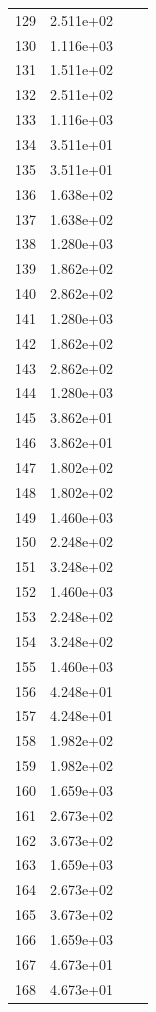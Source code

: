 \documentclass[12pt]{article}
\begin{document}
\begin{longtable}{@{}cccc@{}}
129 & 2.511e+02 &  &  \\
130 & 1.116e+03 &  &  \\
131 & 1.511e+02 &  &  \\
132 & 2.511e+02 &  &  \\
133 & 1.116e+03 &  &  \\
134 & 3.511e+01 &  &  \\
135 & 3.511e+01 &  &  \\
136 & 1.638e+02 &  &  \\
137 & 1.638e+02 &  &  \\
138 & 1.280e+03 &  &  \\
139 & 1.862e+02 &  &  \\
140 & 2.862e+02 &  &  \\
141 & 1.280e+03 &  &  \\
142 & 1.862e+02 &  &  \\
143 & 2.862e+02 &  &  \\
144 & 1.280e+03 &  &  \\
145 & 3.862e+01 &  &  \\
146 & 3.862e+01 &  &  \\
147 & 1.802e+02 &  &  \\
148 & 1.802e+02 &  &  \\
149 & 1.460e+03 &  &  \\
150 & 2.248e+02 &  &  \\
151 & 3.248e+02 &  &  \\
152 & 1.460e+03 &  &  \\
153 & 2.248e+02 &  &  \\
154 & 3.248e+02 &  &  \\
155 & 1.460e+03 &  &  \\
156 & 4.248e+01 &  &  \\
157 & 4.248e+01 &  &  \\
158 & 1.982e+02 &  &  \\
159 & 1.982e+02 &  &  \\
160 & 1.659e+03 &  &  \\
161 & 2.673e+02 &  &  \\
162 & 3.673e+02 &  &  \\
163 & 1.659e+03 &  &  \\
164 & 2.673e+02 &  &  \\
165 & 3.673e+02 &  &  \\
166 & 1.659e+03 &  &  \\
167 & 4.673e+01 &  &  \\
168 & 4.673e+01 &  &  \\

\end{longtable}
\end{document}

